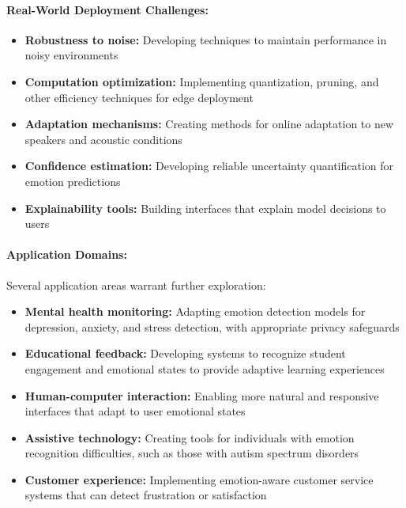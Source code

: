\documentclass[12pt]{article}
\begin{document}
\paragraph{Real-World Deployment Challenges:}
\begin{itemize}
    \item \textbf{Robustness to noise:} Developing techniques to maintain performance in noisy environments
    
    \item \textbf{Computation optimization:} Implementing quantization, pruning, and other efficiency techniques for edge deployment
    
    \item \textbf{Adaptation mechanisms:} Creating methods for online adaptation to new speakers and acoustic conditions
    
    \item \textbf{Confidence estimation:} Developing reliable uncertainty quantification for emotion predictions
    
    \item \textbf{Explainability tools:} Building interfaces that explain model decisions to users
\end{itemize}

\paragraph{Application Domains:}
Several application areas warrant further exploration:

\begin{itemize}
    \item \textbf{Mental health monitoring:} Adapting emotion detection models for depression, anxiety, and stress detection, with appropriate privacy safeguards
    
    \item \textbf{Educational feedback:} Developing systems to recognize student engagement and emotional states to provide adaptive learning experiences
    
    \item \textbf{Human-computer interaction:} Enabling more natural and responsive interfaces that adapt to user emotional states
    
    \item \textbf{Assistive technology:} Creating tools for individuals with emotion recognition difficulties, such as those with autism spectrum disorders
    
    \item \textbf{Customer experience:} Implementing emotion-aware customer service systems that can detect frustration or satisfaction
\end{itemize}
\end{document}
